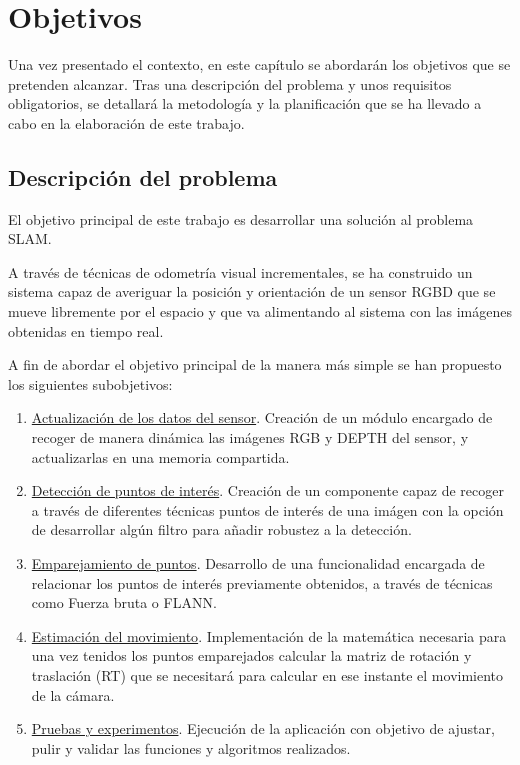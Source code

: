\chapter{Objetivos}

\label{Chapter2} %

Una vez presentado el contexto, en este capítulo se abordarán los objetivos que se pretenden alcanzar. Tras una descripción del problema y unos requisitos obligatorios, se detallará la metodología y la planificación que se ha llevado a cabo en la elaboración de este trabajo.

\section{Descripción del problema}

El objetivo principal de este trabajo es desarrollar una solución al problema SLAM.

A través de técnicas de odometría visual incrementales, se ha construido un sistema capaz de averiguar la posición y orientación de un sensor RGBD que se mueve libremente por el espacio y que va alimentando al sistema con las imágenes obtenidas en tiempo real.

A fin de abordar el objetivo principal de la manera más simple se han propuesto los siguientes subobjetivos:

\begin{enumerate}
\item \underline{Actualización de los datos del sensor}.
Creación de un módulo encargado de recoger de manera dinámica las imágenes RGB y DEPTH del sensor, y actualizarlas en una memoria compartida.
 
\item \underline{Detección de puntos de interés}.
Creación de un componente capaz de recoger a través de diferentes técnicas puntos de interés de una imágen con la opción de desarrollar algún filtro para añadir robustez a la detección.

\item \underline{Emparejamiento de puntos}.
Desarrollo de una funcionalidad encargada de relacionar los puntos de interés previamente obtenidos, a través de técnicas como Fuerza bruta o FLANN.

\item \underline{Estimación del movimiento}.
Implementación de la matemática necesaria para una vez tenidos los puntos emparejados calcular la matriz de rotación y traslación (RT) que se necesitará para calcular en ese instante el movimiento de la cámara.

\item \underline{Pruebas y experimentos}.
Ejecución de la aplicación con objetivo de ajustar, pulir y validar las funciones y algoritmos realizados.

\end{enumerate}

